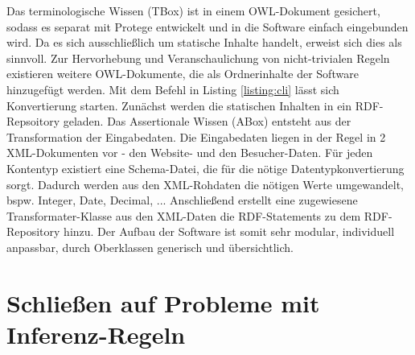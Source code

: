 \documentclass[runningheads,a4paper]{llncs}
\begin{document}
Das terminologische Wissen (TBox) ist in einem OWL-Dokument gesichert, sodass es separat mit Protege entwickelt und in die Software einfach eingebunden wird. 
Da es sich ausschließlich um statische Inhalte handelt, erweist sich dies als sinnvoll. 
Zur Hervorhebung und Veranschaulichung von nicht-trivialen Regeln existieren weitere OWL-Dokumente, die als Ordnerinhalte der Software hinzugefügt werden. 
Mit dem Befehl in Listing \ref{listing:cli} lässt sich Konvertierung starten. 
Zunächst werden die statischen Inhalten in ein RDF-Repsoitory geladen. 
Das Assertionale Wissen (ABox) entsteht aus der Transformation der Eingabedaten. 
Die Eingabedaten liegen in der Regel in 2 XML-Dokumenten vor - den Website- und den Besucher-Daten.
Für jeden Kontentyp existiert eine Schema-Datei, die für die nötige Datentypkonvertierung sorgt. 
Dadurch werden aus den XML-Rohdaten die nötigen Werte umgewandelt, bspw. Integer, Date, Decimal, ...
Anschließend erstellt eine zugewiesene Transformater-Klasse aus den XML-Daten die RDF-Statements zu dem RDF-Repository hinzu. 
Der Aufbau der Software ist somit sehr modular, individuell anpassbar, durch Oberklassen generisch und übersichtlich.

\newpage

\section{Schließen auf Probleme mit Inferenz-Regeln}
\label{sec:reasoning}
\end{document}
